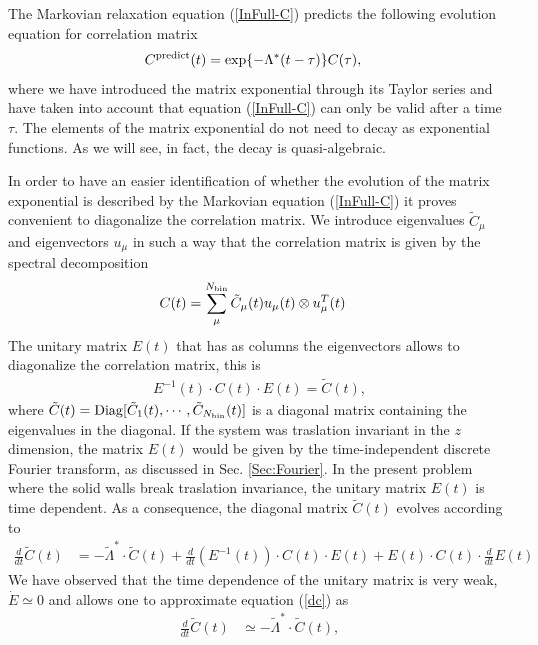 \documentclass[b5paper,openright,10pt]{book}
\newcommand{\esc}{\!\cdot\!}
\begin{document}
The Markovian relaxation equation (\ref{InFull-C}) predicts the following
evolution equation for correlation matrix
\begin{align}
  C^{\rm predict}(t)&=\exp\{-\Lambda^* (t-\tau)\}C(\tau),
\label{Cpredict}
\end{align}
where we  have introduced  the matrix  exponential through  its Taylor
series and have taken into account that equation  (\ref{InFull-C}) can only
be valid after  a time $\tau$. The elements of  the matrix exponential
do not  need to  decay as  exponential functions. As  we will  see, in
fact,  the decay  is  quasi-algebraic.   

In order to have an easier  identification of whether the evolution of
the  matrix  exponential  is   described  by  the  Markovian  equation
(\ref{InFull-C}) it  proves convenient to diagonalize  the correlation
matrix.   We introduce  eigenvalues  $\tilde{C}_\mu$ and  eigenvectors
$u_\mu$ in such a way that  the correlation matrix is given by the
spectral decomposition
\begin{align}
  C(t)&=\sum_\mu^{N_{\rm bin}}\tilde{C}_\mu(t) u_\mu(t) \otimes u_\mu^T(t)
\label{spectral}
\end{align}
The unitary matrix $E(t)$ that  has as columns the eigenvectors allows
to diagonalize the correlation matrix, this is
\begin{align}
  E^{-1}(t)\esc C(t)\esc E(t)=\tilde{C}(t),
\label{diag}
\end{align}
where $\tilde{C}(t)={\rm Diag}[\tilde{C}_1(t),\cdots,\tilde{C}_{N_{\rm
    bin}}(t)]$ is a diagonal matrix  containing the eigenvalues in the
diagonal.   If  the  system  was traslation  invariant  in  the  $z$
dimension, the  matrix $E(t)$ would  be given by  the time-independent
discrete Fourier  transform, as discussed  in Sec. \ref{Sec:Fourier}.   In the
present problem where the solid walls break traslation invariance, the
unitary  matrix  $E(t)$ is  time  dependent.   As a  consequence,  the
diagonal matrix $\tilde{C}(t)$ evolves according to
\begin{align}
\frac{d}{dt}  \tilde{C}(t)&=-\tilde{\Lambda}^*\esc \tilde{C}(t)
  +\frac{d }{dt}(E^{-1}(t)) \esc C(t)\esc E(t)
  +E(t)\esc C(t)\esc \frac{d }{dt}E(t)  
\label{dc}
\end{align}
We have  observed that the  time dependence  of the unitary  matrix is
very weak, $\dot{E}\simeq 0$ and allows one to approximate equation (\ref{dc}) as
\begin{align}
\frac{d}{dt}  \tilde{C}(t)&\simeq-\tilde{\Lambda}^*\esc \tilde{C}(t),
\label{Ctilde}
\end{align}
\end{document}
